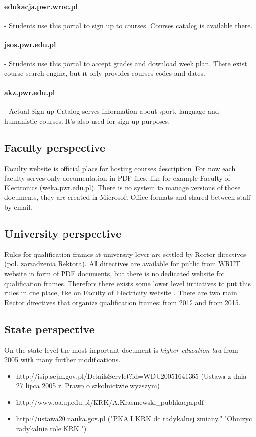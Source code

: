 \documentclass[printmode]{mgr}
\begin{document}
\paragraph{edukacja.pwr.wroc.pl} -
Students use this portal to sign up to courses. Courses catalog is available
there.
\paragraph{jsos.pwr.edu.pl} -
Students use this portal to accept grades and download week plan. There exist
course search engine, but it only provides courses codes and dates.
\paragraph{akz.pwr.edu.pl} -
Actual Sign up Catalog serves information about sport, language and
humanistic courses. It's also used for sign up purposes.


\subsection{Faculty perspective}
Faculty website is official place for hosting courses description. For now
each faculty serves only documentation in PDF files, like for example Faculty
of Electronics (weka.pwr.edu.pl). There is no system to manage versions of
those documents, they are created in Microsoft Office formats and shared
between staff by email.

\subsection{University perspective}

Rules for qualification frames at university lever are settled by Rector
directives (pol. zarzadzenia Rektora). All directives are available for public
from WRUT website in form of PDF documents, but there is no dedicated website
for qualification frames. Therefore there exists some lower level initiatives
to put this rules in one place, like on Faculty of Electricity website
\cite{web:weny-krk}. There are two main Rector directives that organize
qualification frames: from 2012\cite{web:2012-krk} and from
2015\cite{web:2015-krk}.

\subsection{State perspective}
On the state level the most important document is \textit{higher education
law} from 2005 with many further modifications.
\begin{itemize}
  \item http://isip.sejm.gov.pl/DetailsServlet?id=WDU20051641365
    (Ustawa z dnia 27 lipca 2005 r. Prawo o szkolnictwie wyzszym)
  \item http://www.oa.uj.edu.pl/KRK/A.Krasniewski\_publikacja.pdf
  \item http://ustawa20.nauka.gov.pl
    ("PKA I KRK do radykalnej zmiany."
    "Obnizyc radykalnie role KRK.")
\end{itemize}
\end{document}
